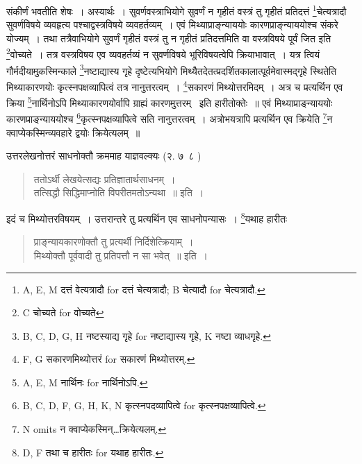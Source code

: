 \documentclass[11pt, openany]{book}
\begin{document}
\noindent
संकीर्णं भवतीति शेषः~। अस्यार्थः~। सुवर्णवस्त्राभियोगे सुवर्णं न गृहीतं वस्त्रं तु गृहीतं प्रतिदत्तं \renewcommand{\thefootnote}{1}\footnote{A, E, M दत्तं वेत्यत्रादौ for दत्तं चेत्यत्रादौ; B चेत्यादौ for चेत्यत्रादौ.}चेत्यत्रादौ सुवर्णविषये व्यवहृत्य पश्चाद्वस्त्रविषये व्यवहर्तव्यम्~। एवं मिथ्याप्राङ्न्याययोः कारणप्राङ्न्याययोश्च संकरे योज्यम्~। तथा तत्रैवाभियोगे सुवर्णं गृहीतं वस्त्रं तु न गृहीतं प्रतिदत्तमिति वा वस्त्रविषये पूर्वं जित इति \renewcommand{\thefootnote}{2}\footnote{C चोच्यते for वोच्यते}वोच्यते~। तत्र वस्त्रविषय एव व्यवहर्तव्यं न सुवर्णविषये भूरिविषयत्वेपि क्रियाभावात्~। यत्र त्वियं गौर्मदीयामुकस्मिन्काले \renewcommand{\thefootnote}{3}\footnote{B, C, D, G, H नष्टस्याद्य गृहे for नष्टाद्यास्य गृहे, K नष्टा व्याधगृहे.}नष्टाद्यास्य गृहे दृष्टेत्यभियोगे मिथ्यैतदेतत्प्रदर्शितकालात्पूर्वमेवास्मद्गृहे स्थितेति मिथ्याकारणयोः कृत्स्नपक्षव्यापित्वं तत्र नानुत्तरत्वम्~। \renewcommand{\thefootnote}{4}\footnote{F, G सकारणमिथ्योत्तरं for सकारणं मिथ्योत्तरम्.}सकारणं मिथ्योत्तरमिदम्~। अत्र च प्रत्यर्थिन एव क्रिया \renewcommand{\thefootnote}{5}\footnote{A, E, M नार्थिनः for नार्थिनोऽपि.}नार्थिनोऽपि मिथ्याकारणयोर्वापि ग्राह्यं कारणमुत्तरम् \textendash\ इति हारीतोक्तेः~॥ एवं मिथ्याप्राङ्न्याययोः कारणप्राङ्न्याययोश्च \renewcommand{\thefootnote}{6}\footnote{B, C, D, F, G, H, K, N कृत्स्नपदव्यापित्वे for कृत्स्नपक्षव्यापित्वे.}कृत्स्नपक्षव्यापित्वे सति नानुत्तरत्वम्~। अत्रोभयत्रापि प्रत्यर्थिन एव क्रियेति \renewcommand{\thefootnote}{7}\footnote{N omits न क्वाप्येकस्मिन्\ldots क्रियेत्यलम्.}न क्वाप्येकस्मिन्व्यवहारे द्वयोः क्रियेत्यलम्~॥

उत्तरलेखनोत्तरं साधनोक्तौ क्रममाह याज्ञवल्क्यः (२. ७\textendash\ ८ )

\begin{quote}
{\vy ततोऽर्थी लेखयेत्सद्यः प्रतिज्ञातार्थसाधनम्~।\\
तत्सिद्धौ सिद्धिमाप्नोति विपरीतमतोऽन्यथा~॥} इति~।
\end{quote}

\newpage
{}

इदं च मिथ्योत्तरविषयम्~। उत्तरान्तरे तु प्रत्यर्थिन एव साधनोपन्यासः~। \renewcommand{\thefootnote}{1}\footnote{D, F तथा च हारीतः for यथाह हारीतः.}यथाह हारीतः

\begin{quote}
{\vy प्राङ्न्यायकारणोक्तौ तु प्रत्यर्थी निर्दिशेत्क्रियाम्~।\\
मिथ्योक्तौ पूर्ववादी तु प्रतिपत्तौ न सा भवेत्~॥} इति~।
\end{quote}
\end{document}
